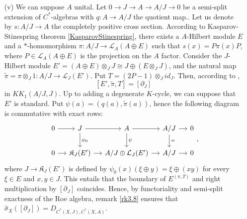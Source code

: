 \begin{dem}
\begin{enumerate}
\item[(v)] We can suppose $A$ unital. Let $0 \rightarrow J \rightarrow A \rightarrow A /J \rightarrow 0$ be a semi-split extension of $C^*$-algebras with $q:A\rightarrow A/J$ the quotient map.. Let us denote by $s : A/J \rightarrow A $ the completely positive cross section.  According to Kasparov-Stinespring theorem \ref{KasparovStinespring}, there exists a $A$-Hilbert module $E$ and a $*$-homomorphism $\pi : A/J \rightarrow \mathcal L_{A}(A\oplus E)$ such that $s(x) = P \pi(x) P$, where $P \in \mathcal L_{A}(A\oplus E)$ is the projection on the $A$ factor. Consider the $J$-Hilbert module $E' = (A\oplus E)\otimes_J J \cong J\oplus (E\otimes_J J)$, and the natural map $\tilde\pi =\pi\otimes_J 1: A/ J \rightarrow \mathcal L_{J}(E')$. Put $T= (2P-1)\otimes_J id_J$. Then, according to \cite{SkandalisExtension}, 
\[[E',\tilde \pi , T] = [\partial_J]\]
in $KK_1(A/J,J)$. Up to adding a degenerate $K$-cycle, we can suppose that $E'$ is standard. Put $\psi ( a ) = (q(a), \tilde \pi (a))$, hence the following diagram is commutative with exact rows:
\[\begin{tikzcd}[column sep = small]
0\arrow{r} &J\arrow{r}\arrow{d}{\psi_0} & A \arrow{r}\arrow{d}{\psi}& A/J\arrow{r}\arrow{d}{=} & 0\\
0\arrow{r} & \mathfrak K_J(E')\arrow{r} & A/J \oplus \mathcal L_J (E') \arrow{r}& A/J\arrow{r} & 0
\end{tikzcd},\]
where $J \rightarrow  \mathfrak K_J(E') $ is defined by $\psi_0(x)(\xi\oplus y) = \xi\oplus (xy) $ for every $\xi\in E$ and $x,y\in J$. 
This entails that the boundary of $E^{(\pi,T)}$ and right multiplication by $[\partial_J]$ coincides. Hence, by functoriality and semi-split exactness of the Roe algebra, remark \ref{rk3.8} ensures that  $\hat\sigma_X([\partial_J]) = D_{C^*(X,J),C^*(X,A)}$.


\end{enumerate}
\end{dem}
